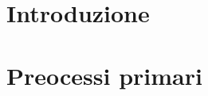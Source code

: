 \documentclass{article}
\begin{document}


\section{Introduzione}
\label{sec:introduzione}


\newpage

\section{Preocessi primari}
\label{sec:processi-primari}

\end{document}
